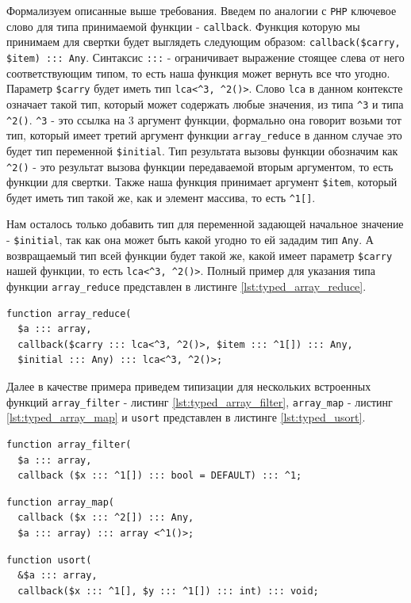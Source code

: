 Формализуем описанные выше требования.
Введем по аналогии с \verb|PHP| ключевое слово для типа принимаемой функции - \verb|callback|.
Функция которую мы принимаем для свертки будет выглядеть следующим образом: \verb|callback($carry, $item) ::: Any|.
Синтаксис \verb|:::| - ограничивает выражение стоящее слева от него соответствующим типом, то есть наша функция может вернуть все что угодно.
Параметр \verb|$carry| будет иметь тип \verb|lca<^3, ^2()>|.
Слово \verb|lca| в данном контексте означает такой тип, который может содержать любые значения, из типа \verb|^3| и типа \verb|^2()|.
\verb|^3| - это ссылка на 3 аргумент функции, формально она говорит возьми тот тип, который имеет третий аргумент функции \verb|array_reduce| в данном случае это будет тип переменной \verb|$initial|.
Тип результата вызовы функции обозначим как \verb|^2()| - это результат вызова функции передаваемой вторым аргументом, то есть функции для свертки.
Также наша функция принимает аргумент \verb|$item|, который будет иметь тип такой же, как и элемент массива, то есть \verb|^1[]|.

Нам осталось только добавить тип для переменной задающей начальное значение - \verb|$initial|, так как она может быть какой угодно то ей зададим тип \verb|Any|.
А возвращаемый тип всей функции будет такой же, какой имеет параметр \verb|$carry| нашей функции, то есть \verb|lca<^3, ^2()>|.
Полный пример для указания типа функции \verb|array_reduce| представлен в листинге \ref{lst:typed_array_reduce}.
\begin{lstlisting}[caption={Пример типизации функции array\_reduce},label={lst:typed_array_reduce}]
function array_reduce(
  $a ::: array,
  callback($carry ::: lca<^3, ^2()>, $item ::: ^1[]) ::: Any,
  $initial ::: Any) ::: lca<^3, ^2()>;
\end{lstlisting}

Далее в качестве примера приведем типизации для нескольких встроенных функций \verb|array_filter| - листинг \ref{lst:typed_array_filter}, \verb|array_map| - листинг \ref{lst:typed_array_map} и \verb|usort| представлен в листинге \ref{lst:typed_usort}.
\begin{lstlisting}[caption={Пример типизации функции array\_filter},label={lst:typed_array_filter}]
function array_filter(
  $a ::: array,
  callback ($x ::: ^1[]) ::: bool = DEFAULT) ::: ^1;
\end{lstlisting}
\begin{lstlisting}[caption={Пример типизации функции array\_map},label={lst:typed_array_map}]
function array_map(
  callback ($x ::: ^2[]) ::: Any,
  $a ::: array) ::: array <^1()>;
\end{lstlisting}
\begin{lstlisting}[caption={Пример типизации функции usort},label={lst:typed_usort}]
function usort(
  &$a ::: array,
  callback($x ::: ^1[], $y ::: ^1[]) ::: int) ::: void;
\end{lstlisting}

